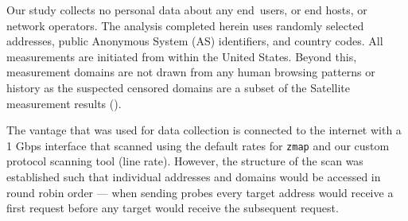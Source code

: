 Our study collects no personal data about any end~users, or end hosts, or
network operators. The analysis completed herein uses randomly selected
addresses, public Anonymous System (AS) identifiers, and country codes.  All
measurements are initiated from within the United States.
Beyond this,
measurement domains are not drawn from any human browsing patterns or history
as the suspected censored domains are a subset of the Satellite measurement
results (\cf {}).

The vantage that was used for data collection is connected to the internet with
a 1 Gbps interface that scanned using the default rates for {\tt zmap} and our
custom protocol scanning tool (line rate). However, the structure of the scan
was established such that individual addresses and domains would be accessed in
round robin order --- \ie when sending probes every target address would
receive a first request before any target would receive the subsequent request.